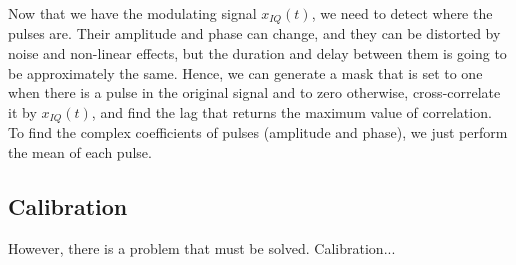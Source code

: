 Now that we have the modulating signal $x_{IQ}(t)$, we need to detect where the pulses are. Their amplitude and phase can change, and they can be distorted by noise and non-linear effects, but the duration and delay between them is going to be approximately the same. Hence, we can generate a mask that is set to one when there is a pulse in the original signal and to zero otherwise, cross-correlate it by $x_{IQ}(t)$, and find the lag that returns the maximum value of correlation. To find the complex coefficients of pulses (amplitude and phase), we just perform the mean of each pulse.

\subsection{Calibration}
However, there is a problem that must be solved. Calibration...
